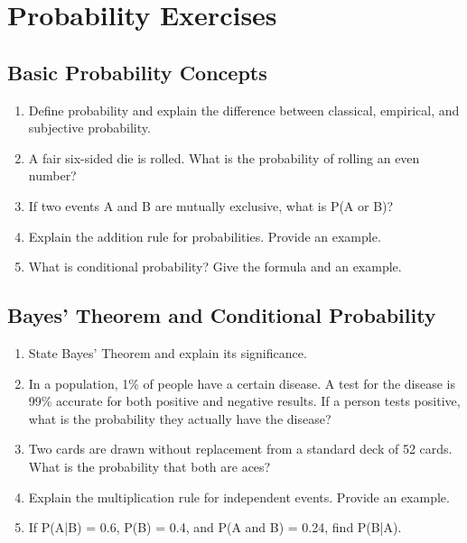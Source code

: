 
\section{Probability Exercises}

\subsection{Basic Probability Concepts}

\begin{enumerate}
    \item Define probability and explain the difference between classical, empirical, and subjective probability.
    
    \item A fair six-sided die is rolled. What is the probability of rolling an even number?
    
    \item If two events A and B are mutually exclusive, what is P(A or B)?
    
    \item Explain the addition rule for probabilities. Provide an example.
    
    \item What is conditional probability? Give the formula and an example.
\end{enumerate}

\subsection{Bayes' Theorem and Conditional Probability}

\begin{enumerate}
    \item State Bayes' Theorem and explain its significance.
    
    \item In a population, 1\% of people have a certain disease. A test for the disease is 99\% accurate for both positive and negative results. If a person tests positive, what is the probability they actually have the disease?
    
    \item Two cards are drawn without replacement from a standard deck of 52 cards. What is the probability that both are aces?
    
    \item Explain the multiplication rule for independent events. Provide an example.
    
    \item If P(A|B) = 0.6, P(B) = 0.4, and P(A and B) = 0.24, find P(B|A).
\end{enumerate}


